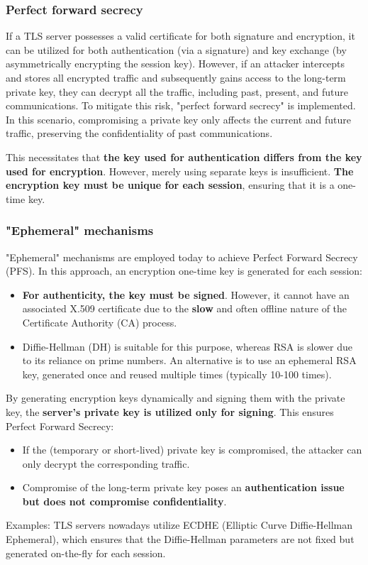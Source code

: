 \subsubsection{Perfect forward secrecy}
If a TLS server possesses a valid certificate for both signature and encryption, it can be utilized for both authentication (via a signature) and key exchange (by asymmetrically encrypting the session key). However, if an attacker intercepts and stores all encrypted traffic and subsequently gains access to the long-term private key, they can decrypt all the traffic, including past, present, and future communications. To mitigate this risk, "perfect forward secrecy" is implemented. In this scenario, compromising a private key only affects the current and future traffic, preserving the confidentiality of past communications.

This necessitates that \textbf{the key used for authentication differs from the key used for encryption}.
However, merely using separate keys is insufficient. \textbf{The encryption key must be unique for each session}, ensuring that it is a one-time key.

\subsubsection{"Ephemeral" mechanisms}
"Ephemeral" mechanisms are employed today to achieve Perfect Forward Secrecy (PFS). In this approach, an encryption one-time key is generated for each session:
\begin{itemize}
    \item \textbf{For authenticity, the key must be signed}. However, it cannot have an associated X.509 certificate due to the \textbf{slow} and often offline nature of the Certificate Authority (CA) process.
    \item Diffie-Hellman (DH) is suitable for this purpose, whereas RSA is slower due to its reliance on prime numbers. An alternative is to use an ephemeral RSA key, generated once and reused multiple times (typically 10-100 times).
\end{itemize}

By generating encryption keys dynamically and signing them with the private key, the \textbf{server's private key is utilized only for signing}. This ensures Perfect Forward Secrecy:
\begin{itemize}
    \item If the (temporary or short-lived) private key is compromised, the attacker can only decrypt the corresponding traffic.
    \item Compromise of the long-term private key poses an \textbf{authentication issue but does not compromise confidentiality}.
\end{itemize}
Examples: TLS servers nowadays utilize ECDHE (Elliptic Curve Diffie-Hellman Ephemeral), which ensures that the Diffie-Hellman parameters are not fixed but generated on-the-fly for each session.


